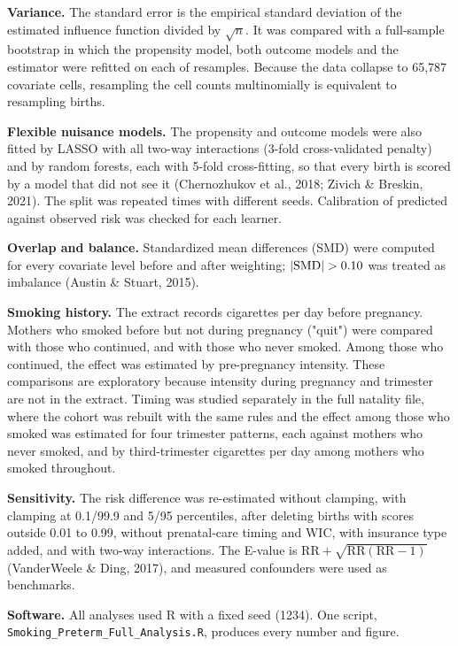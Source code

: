 \documentclass[11pt,letterpaper]{article}
\begin{document}
\textbf{Variance.} The standard error is the empirical standard deviation of the estimated influence function divided by $\sqrt n$. It was compared with a full-sample bootstrap in which the propensity model, both outcome models and the estimator were refitted on each of \BootB{} resamples. Because the data collapse to 65,787 covariate cells, resampling the cell counts multinomially is equivalent to resampling births.

\textbf{Flexible nuisance models.} The propensity and outcome models were also fitted by LASSO with all two-way interactions (3-fold cross-validated penalty) and by random forests, each with 5-fold cross-fitting, so that every birth is scored by a model that did not see it (Chernozhukov et al., 2018; Zivich \& Breskin, 2021). The split was repeated \CFreps{} times with different seeds. Calibration of predicted against observed risk was checked for each learner.

\textbf{Overlap and balance.} Standardized mean differences (SMD) were computed for every covariate level before and after weighting; $|{\rm SMD}|>0.10$ was treated as imbalance (Austin \& Stuart, 2015).

\textbf{Smoking history.} The extract records cigarettes per day before pregnancy. Mothers who smoked before but not during pregnancy ("quit") were compared with those who continued, and with those who never smoked. Among those who continued, the effect was estimated by pre-pregnancy intensity. These comparisons are exploratory because intensity during pregnancy and trimester are not in the extract. Timing was studied separately in the full natality file, where the cohort was rebuilt with the same rules and the effect among those who smoked was estimated for four trimester patterns, each against mothers who never smoked, and by third-trimester cigarettes per day among mothers who smoked throughout.

\textbf{Sensitivity.} The risk difference was re-estimated without clamping, with clamping at 0.1/99.9 and 5/95 percentiles, after deleting births with scores outside 0.01 to 0.99, without prenatal-care timing and WIC, with insurance type added, and with two-way interactions. The E-value is $\mathrm{RR}+\sqrt{\mathrm{RR}(\mathrm{RR}-1)}$ (VanderWeele \& Ding, 2017), and measured confounders were used as benchmarks.

\textbf{Software.} All analyses used R with a fixed seed (1234). One script, \texttt{Smoking\_Preterm\_Full\_Analysis.R}, produces every number and figure.
\end{document}
